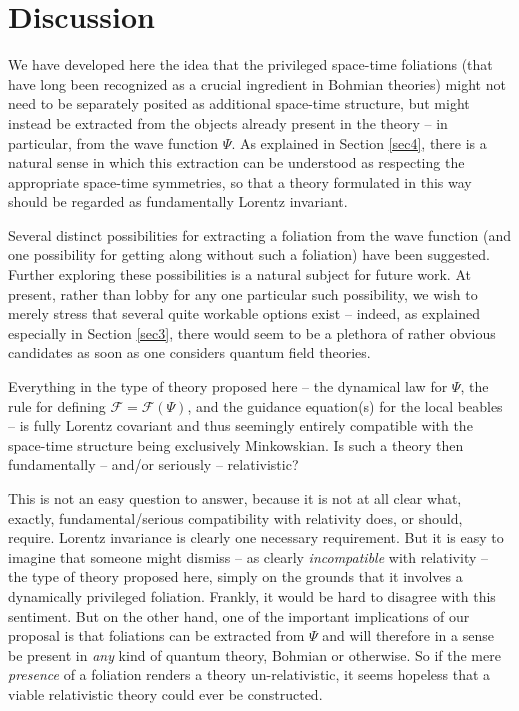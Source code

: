 \documentclass[12pt]{article}
\begin{document}
\section{Discussion}
\label{sec7}

We have developed here the idea that the privileged space-time
foliations (that have long been recognized as a crucial ingredient in Bohmian
theories) might not need to be separately posited as additional
space-time structure, but might instead be extracted from the objects
already present in the theory -- in particular, from the wave function
$\Psi$.  As explained in Section \ref{sec4}, there is a natural sense
in which this extraction can be understood as respecting the
appropriate space-time symmetries, so that a theory
formulated in this way should be regarded as fundamentally Lorentz
invariant.  

Several distinct possibilities for extracting a foliation from the
wave function (and one possibility for getting along without such a
foliation) have been suggested.  Further exploring these possibilities
is a natural subject for future work.  At present, rather than lobby
for any one particular such possibility, we wish to merely stress that
several quite workable options exist -- indeed, as explained
especially in Section \ref{sec3}, there would seem to be a plethora of
rather obvious candidates as soon as one considers quantum field
theories.  


Everything in the type of theory proposed here
-- the dynamical law for $\Psi$, the rule for defining $\mathscr{F} =
\mathscr{F}(\Psi)$, and the guidance equation(s) for the local beables
-- is fully Lorentz covariant and thus seemingly entirely compatible
with the space-time structure being exclusively Minkowskian.  Is such
a theory then fundamentally -- and/or seriously -- relativistic?  

This is not an easy question to answer, because it is not at all clear
what, exactly, fundamental/serious compatibility with relativity does,
or should, require.  Lorentz invariance is clearly one necessary
requirement.  
But it is easy to imagine that someone might dismiss -- as clearly
\emph{incompatible} with relativity -- the type of theory
proposed here, simply on the grounds that it involves a dynamically
privileged foliation.  Frankly, it would be hard to disagree with this
sentiment.  But on the other hand, one of the important implications
of our proposal is that foliations can be extracted from
$\Psi$ and will therefore in a sense be present in \emph{any} kind of quantum
theory, Bohmian or otherwise.  So if the mere \emph{presence} of a 
foliation renders a theory un-relativistic, it seems hopeless that a
viable relativistic theory could ever be constructed.  
\end{document}
